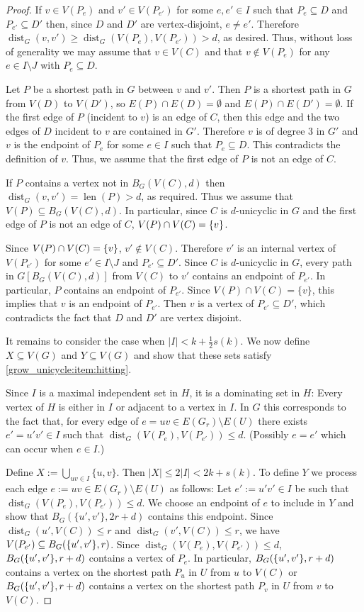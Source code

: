 \documentclass{patmorin}
\DeclareMathOperator{\len}{len}
\DeclareMathOperator{\dist}{dist}
\DeclarePairedDelimiter\set{\{}{\}}
\begin{document}
\begin{proof}
  If $v\in V(P_e)$ and $v'\in V(P_{e'})$ for some  $e,e' \in I$ such that $P_e\subseteq D$ and $P_{e'}\subseteq D'$ then, since $D$ and $D'$ are vertex-disjoint, $e\neq e'$. Therefore $\dist_G(v,v')\geq  \dist_G(V(P_e),V(P_{e'}))>d$, as desired.  Thus, without loss of generality we may assume that $v\in V(C)$ and that $v\notin V(P_e)$ for any $e\in I\setminus J$ with $P_e\subseteq D$.

  Let $P$ be a shortest path in $G$ between $v$ and $v'$.  Then $P$ is a shortest path in $G$ from $V(D)$ to $V(D')$, so $E(P)\cap E(D)=\emptyset$ and $E(P)\cap E(D')=\emptyset$.  If the first edge of $P$ (incident to $v$) is an edge of $C$, then this edge and the two edges of $D$ incident to $v$ are contained in $G'$. Therefore $v$ is of degree $3$ in $G'$ and $v$ is the endpoint of $P_e$ for some $e\in I$ such that $P_e\subseteq D$.  This contradicts the definition of $v$. Thus, we assume that the first edge of $P$ is not an edge of $C$.

  If $P$ contains a vertex not in $B_G(V(C),d)$ then $\dist_G(v,v')=\len(P)>d$, as required.  Thus we assume that $V(P)\subseteq B_G(V(C),d)$. In particular, since $C$ is $d$-unicyclic in $G$ and the first edge of $P$ is not an edge of $C$, $V(P)\cap V(C)=\set{v}$.

  Since $V(P)\cap V(C)=\set{v}$,  $v'\notin V(C)$.  Therefore $v'$ is an internal vertex of $V(P_{e'})$ for some $e'\in I\setminus J$ and $P_{e'}\subseteq D'$.  Since $C$ is $d$-unicyclic in $G$, every path in $G[B_G(V(C),d)]$ from $V(C)$ to $v'$ contains an endpoint of $P_{e'}$.  In particular, $P$ contains an endpoint of $P_{e'}$.  Since $V(P)\cap V(C)=\{v\}$, this implies that $v$ is an endpoint of $P_{e'}$.  Then $v$ is a vertex of $P_{e'}\subseteq D'$, which contradicts the fact that $D$ and $D'$ are vertex disjoint.

  It remains to consider the case when $|I| < k+\frac{1}{2}s(k)$.  We now define $X\subseteq V(G)$ and $Y\subseteq V(G)$ and show that these sets satisfy \cref{grow_unicycle:item:hitting}.

  Since $I$ is a maximal independent set in $H$, it is a dominating set in $H$: Every vertex of $H$ is either in $I$ or adjacent to a vertex in $I$.  In $G$ this corresponds to the fact that, for every edge of $e=uv\in E(G_r)\setminus E(U)$ there exists $e'=u'v'\in I$ such that $\dist_G(V(P_{e}),V(P_{e'}))\le d$.  (Possibly $e=e'$ which can occur when $e\in I$.)

  Define $X:=\bigcup_{uv\in I}\{u,v\}$.  Then $|X|\le 2|I| < 2k+s(k)$.  To define $Y$ we process each edge $e:=uv\in E(G_r)\setminus E(U)$ as follows: Let $e':=u'v'\in I$ be such that $\dist_G(V(P_{e}),V(P_{e'}))\le d$.  We choose an endpoint of $e$ to include in $Y$ and show that $B_G(\{u',v'\}, 2r+d)$ contains this endpoint. Since $\dist_G(u',V(C))\leq r$ and $\dist_G(v',V(C))\leq r$, we have $V(P_{e'}) \subseteq B_G(\set{u',v'},r)$. Since $\dist_G(V(P_e),V(P_{e'}))\le d$,  $B_G(\set{u',v'},r+d)$ contains a vertex of $P_e$. In particular, $B_G(\set{u',v'},r+d)$ contains a vertex on the shortest path $P_u$ in $U$ from $u$ to $V(C)$ or $B_G(\set{u',v'},r+d)$ contains a vertex on the shortest path $P_v$ in $U$ from $v$ to $V(C)$.


\end{proof}
\end{document}
